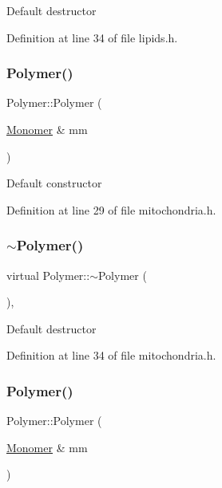Default destructor 

Definition at line 34 of file lipids.\+h.

\mbox{\label{class_polymer_ae77454a3908652e4df6a26b9cac509a5}} 
\subsubsection{\texorpdfstring{Polymer()}{Polymer()}\hspace{0.1cm}{\footnotesize\ttfamily [7/14]}}
{\footnotesize\ttfamily Polymer\+::\+Polymer (\begin{DoxyParamCaption}\item[{\hyperlink{class_monomer}{Monomer} \&}]{mm }\end{DoxyParamCaption})\hspace{0.3cm}{\ttfamily [inline]}}

Default constructor 

Definition at line 29 of file mitochondria.\+h.

\mbox{\label{class_polymer_aac2b3983f375a5691c7d5ca1a79594d5}} 
\subsubsection{\texorpdfstring{$\sim$\+Polymer()}{~Polymer()}\hspace{0.1cm}{\footnotesize\ttfamily [7/11]}}
{\footnotesize\ttfamily virtual Polymer\+::$\sim$\+Polymer (\begin{DoxyParamCaption}{ }\end{DoxyParamCaption})\hspace{0.3cm}{\ttfamily [inline]}, {\ttfamily [virtual]}}

Default destructor 

Definition at line 34 of file mitochondria.\+h.

\mbox{\label{class_polymer_ae77454a3908652e4df6a26b9cac509a5}} 
\subsubsection{\texorpdfstring{Polymer()}{Polymer()}\hspace{0.1cm}{\footnotesize\ttfamily [8/14]}}
{\footnotesize\ttfamily Polymer\+::\+Polymer (\begin{DoxyParamCaption}\item[{\hyperlink{class_monomer}{Monomer} \&}]{mm }\end{DoxyParamCaption})\hspace{0.3cm}{\ttfamily [inline]}}

